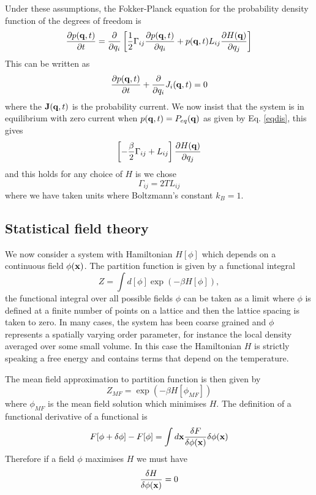 Under these assumptions, the Fokker-Planck equation for the probability density function of the degrees of freedom is 
\begin{equation}
\frac{\partial p({\bf q},t)}{\partial t} = \frac{\partial}{\partial q_i} \left[\frac{1}{2}\Gamma_{ij} \frac{\partial p({\bf q},t)}{\partial q_i} + p({\bf q},t) L_{ij}\frac{\partial H({\bf q})}{ \partial q_j}\right]
\end{equation}
This can be written as 
\begin{equation}
\frac{\partial p({\bf q},t)}{\partial t} +\frac{\partial}{\partial q_i}J_i({\bf q},t)=0
\end{equation}
where the ${\bf J}({\bf q},t)$ is the probability current. We now insist that the system is in equilibrium with zero current when $p({\bf q},t)= P_{eq}({\bf q})$ as given by Eq. \eqref{eqdis}, this gives
\begin{equation}
\left[-\frac{\beta}{2}\Gamma_{ij} + L_{ij}\right]\frac{\partial H({\bf q})}{ \partial q_j}
\end{equation}
and this holds for any choice of $H$ is we chose
\begin{equation}
\Gamma_{ij}= 2T L_{ij}
\end{equation}
where we have taken units where Boltzmann's constant $k_B=1$. 

\subsection{Statistical field theory}

We now consider a system with Hamiltonian $H[\phi]$ which depends on a continuous field $\phi({\bf x})$. The partition function is given by a functional integral
\begin{equation}
Z = \int d[\phi] \exp(-\beta H[\phi]),
\end{equation}
the functional integral over all possible fields $\phi$ can be taken as a limit where $\phi$ is defined at a finite number of points on a lattice and then the lattice spacing is taken to zero. 
In many cases, the system has been coarse grained and $\phi$ represents a spatially varying order parameter, for instance the local density averaged over some small volume. In this case the Hamiltonian $H$ is strictly speaking a free energy and contains terms that depend on the temperature.

The mean field approximation to partition function is then given by
\begin{equation}
Z _{MF}= \exp(-\beta H[\phi_{MF}])
\end{equation} 
where $\phi_{MF}$ is the mean field solution which minimises $H$. The definition of a functional derivative of a functional is
\begin{equation}
F[\phi+\delta\phi]-F[\phi]= \int d{\bf x} \frac{\delta F}{\delta\phi({\bf x})} \delta\phi({\bf x})
\end{equation}
Therefore if a field $\phi$ maximises $H$ we must have 
\begin{equation}
\frac{\delta H}{\delta\phi({\bf x})}=0
\end{equation}


